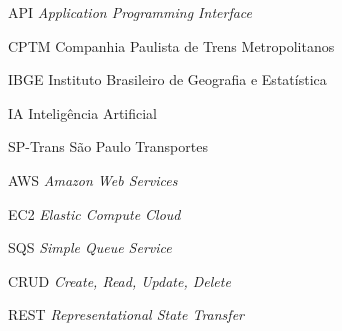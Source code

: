 \begin{siglas}
    \item[API] \textit{Application Programming Interface}
	\item[CPTM] {Companhia Paulista de Trens Metropolitanos}
	\item[IBGE] {Instituto Brasileiro de Geografia e Estatística}
	\item[IA]  {Inteligência Artificial}
	\item[SP-Trans] {São Paulo Transportes}
	\item[AWS] \textit{Amazon Web Services}
	\item[EC2] \textit{Elastic Compute Cloud}
	\item[SQS] \textit{Simple Queue Service}
	\item[CRUD] \textit{Create, Read, Update, Delete}
	\item[REST] \textit{Representational State Transfer}

\end{siglas}
